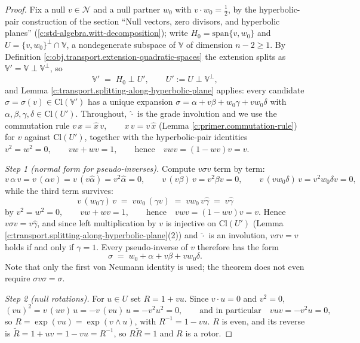 \documentclass[11pt]{article}
\theoremstyle{definition}
\theoremstyle{plain}
\providecommand{\Cl}{}\renewcommand{\Cl}{\mathrm{Cl}}
\providecommand{\Ncone}{}\renewcommand{\Ncone}{\mathcal{N}}
\begin{document}
\begin{proof}
Fix a null $v \in \Ncone$ and a null partner $w_0$ with $v \cdot w_0 = \tfrac12$, by the hyperbolic-pair construction of the section ``Null vectors, zero divisors, and hyperbolic planes'' (\ref{c:std-algebra.witt-decomposition}); write $H_0 = \mathrm{span}\{v, w_0\}$ and $U = \{v, w_0\}^{\perp} \cap \mathbb{V}$, a nondegenerate subspace of $\mathbb{V}$ of dimension $n - 2 \geq 1$. By Definition \ref{c:obj.transport.extension-quadratic-spaces} the extension splits as $\mathbb{V}' = \mathbb{V} \perp \mathbb{V}^{\perp}$, so
\[
\mathbb{V}' \;=\; H_0 \perp U', \qquad U' \mathrel{:=} U \perp \mathbb{V}^{\perp},
\]
and Lemma \ref{c:transport.splitting-along-hyperbolic-plane} applies: every candidate $\sigma = \sigma(v) \in \Cl(\mathbb{V}')$ has a unique expansion $\sigma = \alpha + v\beta + w_0\gamma + v w_0 \delta$ with $\alpha, \beta, \gamma, \delta \in \Cl(U')$. Throughout, $\hat{\cdot}$ is the grade involution and we use the commutation rule $v\,x = \hat{x}\,v, \qquad x\,v = v\,\hat{x}$ (Lemma \ref{c:primer.commutation-rule}) for $v$ against $\Cl(U')$, together with the hyperbolic-pair identities $v^2 = w^2 = 0, \qquad vw + wv = 1, \qquad \text{hence} \quad vwv = (1 - wv)v = v$.

\emph{Step 1 (normal form for pseudo-inverses).} Compute $v\sigma v$ term by term:
\[
v\,\alpha\, v = v\, (\alpha v) = v\,(v \hat{\alpha}) = v^2 \hat\alpha = 0, \qquad
v\,(v\beta)\,v = v^2 \beta v = 0, \qquad
v\,(v w_0 \delta)\,v = v^2 w_0 \delta v = 0,
\]
while the third term survives:
\[
v\,(w_0 \gamma)\,v \;=\; v w_0\,(\gamma v) \;=\; v w_0\, v \hat{\gamma} \;=\; v \hat{\gamma}
\]
by $v^2 = w^2 = 0, \qquad vw + wv = 1, \qquad \text{hence} \quad vwv = (1 - wv)v = v$. Hence $v \sigma v = v \hat{\gamma}$, and since left multiplication by $v$ is injective on $\Cl(U')$ (Lemma \ref{c:transport.splitting-along-hyperbolic-plane}(2)) and $\hat{\cdot}$ is an involution, $v \sigma v = v$ holds if and only if $\gamma = 1$. Every pseudo-inverse of $v$ therefore has the form
\[
\sigma \;=\; w_0 + \alpha + v\beta + v w_0 \delta .
\]
Note that only the first von Neumann identity is used; the theorem does not even require $\sigma v \sigma = \sigma$.

\emph{Step 2 (null rotations).} For $u \in U$ set $R = 1 + vu$. Since $v \cdot u = 0$ and $v^2 = 0$,
\[
(vu)^2 = v\,(uv)\,u = -v\,(vu)\,u = -v^2 u^2 = 0, \qquad \text{and in particular} \quad vuv = -v^2u = 0,
\]
so $R = \exp(vu) = \exp(v \wedge u)$, with $R^{-1} = 1 - vu$. $R$ is even, and its reverse is $\widetilde{R} = 1 + uv = 1 - vu = R^{-1}$, so $R \widetilde{R} = 1$ and $R$ is a rotor.


\end{proof}
\end{document}
